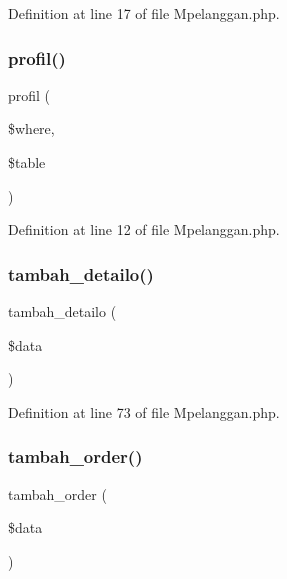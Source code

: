 Definition at line 17 of file Mpelanggan.\+php.

\mbox{\label{class_mpelanggan_a76e16cab9f6d103739adac11e86bce5f}} 
\subsubsection{\texorpdfstring{profil()}{profil()}}
{\footnotesize\ttfamily profil (\begin{DoxyParamCaption}\item[{}]{\$where,  }\item[{}]{\$table }\end{DoxyParamCaption})}



Definition at line 12 of file Mpelanggan.\+php.

\mbox{\label{class_mpelanggan_a8cb5db96c9950be16b2f23d67501bf44}} 
\subsubsection{\texorpdfstring{tambah\_detailo()}{tambah\_detailo()}}
{\footnotesize\ttfamily tambah\+\_\+detailo (\begin{DoxyParamCaption}\item[{}]{\$data }\end{DoxyParamCaption})}



Definition at line 73 of file Mpelanggan.\+php.

\mbox{\label{class_mpelanggan_a942758017dc79d0d59bf4ba7b09d0b53}} 
\subsubsection{\texorpdfstring{tambah\_order()}{tambah\_order()}}
{\footnotesize\ttfamily tambah\+\_\+order (\begin{DoxyParamCaption}\item[{}]{\$data }\end{DoxyParamCaption})}



